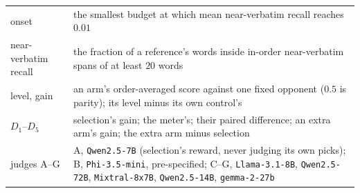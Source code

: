 \documentclass{article}
\begin{document}
\begin{table}[!ht]
\begin{tabular}{@{}p{}p{}@{}}
onset & \raggedright the smallest budget at which mean near-verbatim recall reaches $0.01$ \tabularnewline
near-verbatim recall & \raggedright the fraction of a reference's words inside in-order near-verbatim spans of at least $20$ words \tabularnewline
level, gain & \raggedright an arm's order-averaged score against one fixed opponent ($0.5$ is parity); its level minus its own control's \tabularnewline
$D_1$--$D_5$ & \raggedright selection's gain; the meter's; their paired difference; an extra arm's gain; the extra arm minus selection \tabularnewline
judges A--G & \raggedright A, \texttt{Qwen2.5-7B} (selection's reward, never judging its own picks); B, \texttt{Phi-3.5-mini}, pre-specified; C--G, \texttt{Llama-3.1-8B}, \texttt{Qwen2.5-72B}, \texttt{Mixtral-8x7B}, \texttt{Qwen2.5-14B}, \texttt{gemma-2-27b} \tabularnewline
\bottomrule
\end{tabular}
\end{table}






\end{document}
